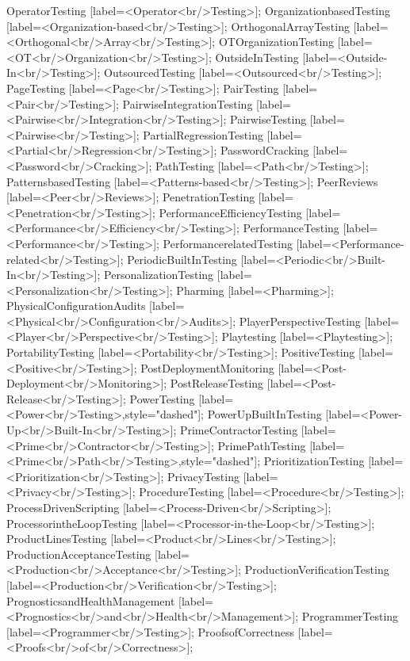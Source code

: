 \documentclass{article}
\begin{document}
{OperatorTesting [label=<Operator<br/>Testing>];
OrganizationbasedTesting [label=<Organization-based<br/>Testing>];
OrthogonalArrayTesting [label=<Orthogonal<br/>Array<br/>Testing>];
OTOrganizationTesting [label=<OT<br/>Organization<br/>Testing>];
OutsideInTesting [label=<Outside-In<br/>Testing>];
OutsourcedTesting [label=<Outsourced<br/>Testing>];
PageTesting [label=<Page<br/>Testing>];
PairTesting [label=<Pair<br/>Testing>];
PairwiseIntegrationTesting [label=<Pairwise<br/>Integration<br/>Testing>];
PairwiseTesting [label=<Pairwise<br/>Testing>];
PartialRegressionTesting [label=<Partial<br/>Regression<br/>Testing>];
PasswordCracking [label=<Password<br/>Cracking>];
PathTesting [label=<Path<br/>Testing>];
PatternsbasedTesting [label=<Patterns-based<br/>Testing>];
PeerReviews [label=<Peer<br/>Reviews>];
PenetrationTesting [label=<Penetration<br/>Testing>];
PerformanceEfficiencyTesting [label=<Performance<br/>Efficiency<br/>Testing>];
PerformanceTesting [label=<Performance<br/>Testing>];
PerformancerelatedTesting [label=<Performance-related<br/>Testing>];
PeriodicBuiltInTesting [label=<Periodic<br/>Built-In<br/>Testing>];
PersonalizationTesting [label=<Personalization<br/>Testing>];
Pharming [label=<Pharming>];
PhysicalConfigurationAudits [label=<Physical<br/>Configuration<br/>Audits>];
PlayerPerspectiveTesting [label=<Player<br/>Perspective<br/>Testing>];
Playtesting [label=<Playtesting>];
PortabilityTesting [label=<Portability<br/>Testing>];
PositiveTesting [label=<Positive<br/>Testing>];
PostDeploymentMonitoring [label=<Post-Deployment<br/>Monitoring>];
PostReleaseTesting [label=<Post-Release<br/>Testing>];
PowerTesting [label=<Power<br/>Testing>,style="dashed"];
PowerUpBuiltInTesting [label=<Power-Up<br/>Built-In<br/>Testing>];
PrimeContractorTesting [label=<Prime<br/>Contractor<br/>Testing>];
PrimePathTesting [label=<Prime<br/>Path<br/>Testing>,style="dashed"];
PrioritizationTesting [label=<Prioritization<br/>Testing>];
PrivacyTesting [label=<Privacy<br/>Testing>];
ProcedureTesting [label=<Procedure<br/>Testing>];
ProcessDrivenScripting [label=<Process-Driven<br/>Scripting>];
ProcessorintheLoopTesting [label=<Processor-in-the-Loop<br/>Testing>];
ProductLinesTesting [label=<Product<br/>Lines<br/>Testing>];
ProductionAcceptanceTesting [label=<Production<br/>Acceptance<br/>Testing>];
ProductionVerificationTesting [label=<Production<br/>Verification<br/>Testing>];
PrognosticsandHealthManagement [label=<Prognostics<br/>and<br/>Health<br/>Management>];
ProgrammerTesting [label=<Programmer<br/>Testing>];
ProofsofCorrectness [label=<Proofs<br/>of<br/>Correctness>];
}
\end{document}
